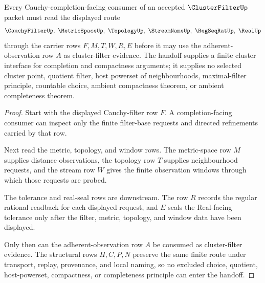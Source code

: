 \begin{theorem}
\label{thm:cluster-filter-cauchy-completion-handoff}
Every Cauchy-completion-facing consumer of an accepted $\ClusterFilterUp$ packet must read the displayed route
$$
\CauchyFilterUp,\ \MetricSpaceUp,\ \TopologyUp,\ \StreamNameUp,\ \RegSeqRatUp,\ \RealUp
$$
through the carrier rows $F,M,T,W,R,E$ before it may use the adherent-observation row $A$ as cluster-filter evidence. The handoff supplies a finite cluster interface for completion and compactness arguments; it supplies no selected cluster point, quotient filter, host powerset of neighbourhoods, maximal-filter principle, countable choice, ambient compactness theorem, or ambient completeness theorem.
\end{theorem}
\begin{proof}
Start with the displayed Cauchy-filter row $F$. A completion-facing consumer can inspect only the finite filter-base requests and directed refinements carried by that row.

Next read the metric, topology, and window rows. The metric-space row $M$ supplies distance observations, the topology row $T$ supplies neighbourhood requests, and the stream row $W$ gives the finite observation windows through which those requests are probed.

The tolerance and real-seal rows are downstream. The row $R$ records the regular rational readback for each displayed request, and $E$ seals the Real-facing tolerance only after the filter, metric, topology, and window data have been displayed.

Only then can the adherent-observation row $A$ be consumed as cluster-filter evidence. The structural rows $H,C,P,N$ preserve the same finite route under transport, replay, provenance, and local naming, so no excluded choice, quotient, host-powerset, compactness, or completeness principle can enter the handoff.
\end{proof}



